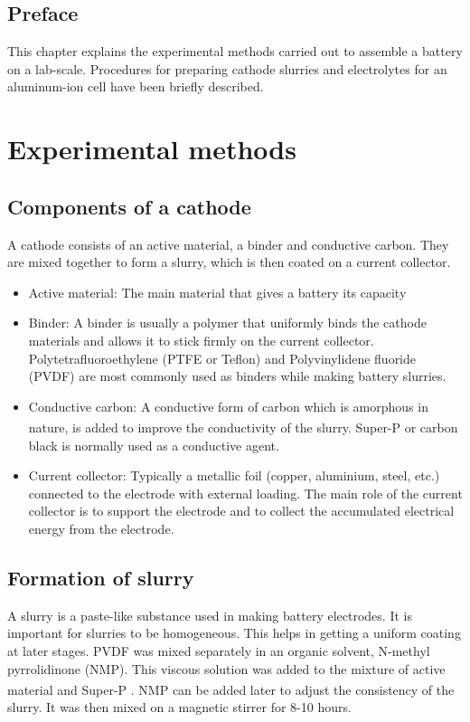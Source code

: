 \section*{\centering Preface}
This chapter explains the experimental methods carried out to assemble a battery on a lab-scale. Procedures for preparing cathode slurries and electrolytes for an aluminum-ion cell have been briefly described. 
\pagebreak
\chapter{Experimental methods} %

\label{chap3} %

\section{Components of a cathode}
A cathode consists of an active material, a binder and conductive carbon. They are mixed together to form a slurry, which is then coated on a current collector.  
\begin{itemize}
    \item Active material: The main material that gives a battery its capacity
    \item Binder: A binder is usually a polymer that uniformly binds the cathode materials and allows it to stick firmly on the current collector. Polytetrafluoroethylene (PTFE or Teflon) and Polyvinylidene fluoride (PVDF) are most commonly used as binders while making battery slurries.
    \item Conductive carbon: A conductive form of carbon which is amorphous in nature, is added to improve the conductivity of the slurry. Super-P\textsuperscript{\textregistered} or carbon black is normally used as a conductive agent. 
    \item Current collector: Typically a metallic foil (copper, aluminium, steel, etc.) connected to the electrode with external loading. The main role of the current collector is to support the electrode and to collect the accumulated electrical energy from the electrode\cite{sun_effect_2017}.
\end{itemize}

\section{Formation of slurry}
A slurry is a paste-like substance used in making battery electrodes. It is important for slurries to be homogeneous. This helps in getting a uniform coating at later stages.  PVDF was mixed separately in an organic solvent, N-methyl pyrrolidinone (NMP). This viscous solution was added to the mixture of active material and Super-P\textsuperscript{\textregistered} . NMP can be added later to adjust the consistency of the slurry. It was then mixed on a magnetic stirrer for 8-10 hours. 

